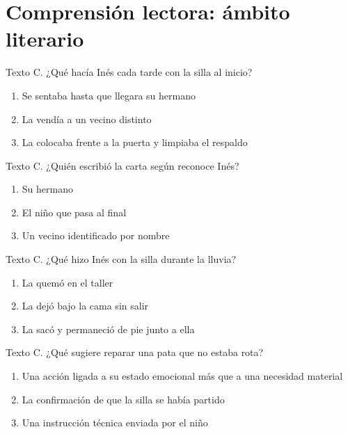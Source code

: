 \section{Comprensión lectora: ámbito literario}



\noindent\begin{minipage}{\linewidth}\setlength{\parskip}{4pt}\label{q:L-013}
Texto C. ¿Qué hacía Inés cada tarde con la silla al inicio?
\begin{enumerate}[label=\Alph*),nosep]
\item Se sentaba hasta que llegara su hermano
\item La vendía a un vecino distinto
\item La colocaba frente a la puerta y limpiaba el respaldo
\end{enumerate}\end{minipage}\par\medskip

\noindent\begin{minipage}{\linewidth}\setlength{\parskip}{4pt}\label{q:L-014}
Texto C. ¿Quién escribió la carta según reconoce Inés?
\begin{enumerate}[label=\Alph*),nosep]
\item Su hermano
\item El niño que pasa al final
\item Un vecino identificado por nombre
\end{enumerate}\end{minipage}\par\medskip

\noindent\begin{minipage}{\linewidth}\setlength{\parskip}{4pt}\label{q:L-015}
Texto C. ¿Qué hizo Inés con la silla durante la lluvia?
\begin{enumerate}[label=\Alph*),nosep]
\item La quemó en el taller
\item La dejó bajo la cama sin salir
\item La sacó y permaneció de pie junto a ella
\end{enumerate}\end{minipage}\par\medskip

\noindent\begin{minipage}{\linewidth}\setlength{\parskip}{4pt}\label{q:L-016}
Texto C. ¿Qué sugiere reparar una pata que no estaba rota?
\begin{enumerate}[label=\Alph*),nosep]
\item Una acción ligada a su estado emocional más que a una necesidad material
\item La confirmación de que la silla se había partido
\item Una instrucción técnica enviada por el niño
\end{enumerate}\end{minipage}\par\medskip


